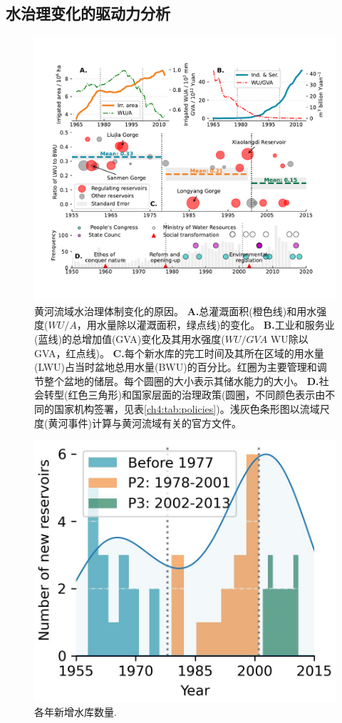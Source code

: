
\subsection{水治理变化的驱动力分析}
\label{Res.2}

\begin{figure}[th!]
	\centering
	\includegraphics[width=0.9\linewidth]{img/ch4/causes.pdf}
	\caption{
		黄河流域水治理体制变化的原因。
		\textbf{A.}总灌溉面积(橙色线)和用水强度($WU/A$，用水量除以灌溉面积，绿点线)的变化。
        \textbf{B.}工业和服务业(蓝线)的总增加值(GVA)变化及其用水强度($WU/GVA$ WU除以GVA，红点线)。
        \textbf{C.}每个新水库的完工时间及其所在区域的用水量(LWU)占当时盆地总用水量(BWU)的百分比。红圈为主要管理和调节整个盆地的储层。每个圆圈的大小表示其储水能力的大小。
        \textbf{D.}社会转型(红色三角形)和国家层面的治理政策(圆圈，不同颜色表示由不同的国家机构签署，见表\ref{ch4:tab:policies})。浅灰色条形图以流域尺度(黄河事件)计算与黄河流域有关的官方文件。
	}
	\label{ch4:fig:mechanism}
\end{figure}


\begin{figure}[tb]
    \centering
    \includegraphics[width=0.6\linewidth]{img/ch4/reservoirs.jpg}
    \caption{
        各年新增水库数量.
    }
    \label{ch4:fig:reservoirs}
\end{figure}


